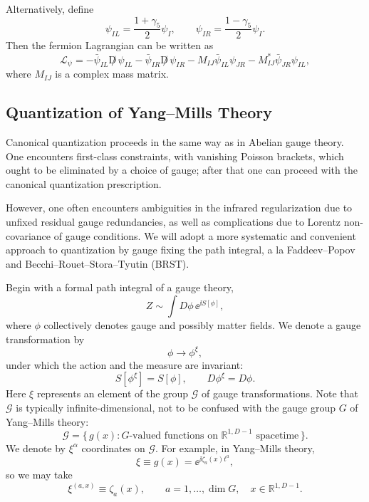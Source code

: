 Alternatively, define
\[
  \psi_{IL}=\frac{1+\gamma_5}{2}\psi_I,
  \qquad
  \psi_{IR}=\frac{1-\gamma_5}{2}\psi_I.
\]
Then the fermion Lagrangian can be written as
\[
  \mathcal L_\psi
  =
  -\bar\psi_{IL}\not D\,\psi_{IL}
  -\bar\psi_{IR}\not D\,\psi_{IR}
  -M_{IJ}\bar\psi_{IL}\psi_{JR}
  -M^*_{IJ}\bar\psi_{JR}\psi_{IL},
\]
where \(M_{IJ}\) is a complex mass matrix.

\subsection{Quantization of Yang--Mills Theory}

Canonical quantization proceeds in the same way as in Abelian gauge
theory.  One encounters first-class constraints, with vanishing Poisson
brackets, which ought to be eliminated by a choice of gauge; after that
one can proceed with the canonical quantization prescription.

However, one often encounters ambiguities in the infrared regularization
due to unfixed residual gauge redundancies, as well as complications due
to Lorentz non-covariance of gauge conditions.  We will adopt a more
systematic and convenient approach to quantization by gauge fixing the
path integral, a la Faddeev--Popov and
Becchi--Rouet--Stora--Tyutin (BRST).

Begin with a formal path integral of a gauge theory,
\[
  Z\sim \int D\phi\,\ee^{\ii S[\phi]},
\]
where \(\phi\) collectively denotes gauge and possibly matter fields.  We
denote a gauge transformation by
\[
  \phi \longrightarrow \phi^\xi,
\]
under which the action and the measure are invariant:
\[
  S[\phi^\xi]=S[\phi],
  \qquad
  D\phi^\xi=D\phi.
\]
Here \(\xi\) represents an element of the group \(\mathcal G\) of gauge
transformations.  Note that \(\mathcal G\) is typically
infinite-dimensional, not to be confused with the gauge group \(G\) of
Yang--Mills theory:
\[
  \mathcal G
  =
  \{\,g(x):G\text{-valued functions on }\mathbb R^{1,D-1}
  \text{ spacetime}\,\}.
\]
We denote by \(\xi^\alpha\) coordinates on \(\mathcal G\).  For example,
in Yang--Mills theory,
\[
  \xi \equiv g(x)=\ee^{\ii\zeta_a(x)t^a},
\]
so we may take
\[
  \xi^{(a,x)}\equiv \zeta_a(x),
  \qquad
  a=1,\ldots,\dim G,\quad x\in\mathbb R^{1,D-1}.
\]

